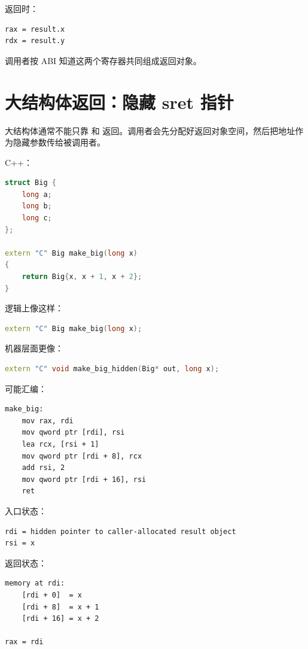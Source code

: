 返回时：

\begin{lstlisting}
rax = result.x
rdx = result.y
\end{lstlisting}

调用者按 ABI 知道这两个寄存器共同组成返回对象。

\section{大结构体返回：隐藏 sret 指针}

大结构体通常不能只靠  和  返回。调用者会先分配好返回对象空间，然后把地址作为隐藏参数传给被调用者。

C++：

\begin{lstlisting}[language=C++]
struct Big {
    long a;
    long b;
    long c;
};

extern "C" Big make_big(long x)
{
    return Big{x, x + 1, x + 2};
}
\end{lstlisting}

逻辑上像这样：

\begin{lstlisting}[language=C++]
extern "C" Big make_big(long x);
\end{lstlisting}

机器层面更像：

\begin{lstlisting}[language=C++]
extern "C" void make_big_hidden(Big* out, long x);
\end{lstlisting}

可能汇编：

\begin{lstlisting}
make_big:
    mov rax, rdi
    mov qword ptr [rdi], rsi
    lea rcx, [rsi + 1]
    mov qword ptr [rdi + 8], rcx
    add rsi, 2
    mov qword ptr [rdi + 16], rsi
    ret
\end{lstlisting}

入口状态：

\begin{lstlisting}
rdi = hidden pointer to caller-allocated result object
rsi = x
\end{lstlisting}

返回状态：

\begin{lstlisting}
memory at rdi:
    [rdi + 0]  = x
    [rdi + 8]  = x + 1
    [rdi + 16] = x + 2

rax = rdi
\end{lstlisting}

